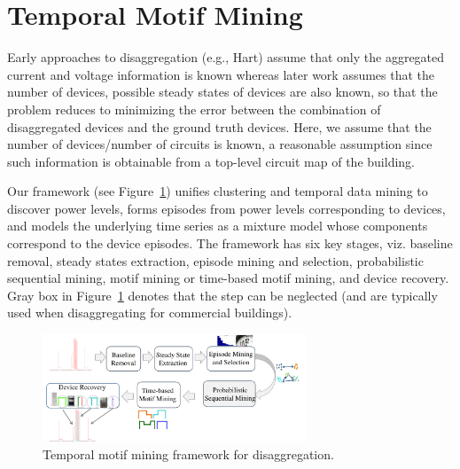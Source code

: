 %

\section{Temporal Motif Mining}
Early approaches to disaggregation (e.g., Hart\cite{hart1992})
assume that only the
aggregated current and voltage information is known whereas
later work assumes that the number of devices, possible steady states
of devices are also known,
so that the problem reduces to minimizing the error between
the combination of disaggregated devices and the ground truth devices.
Here, we assume that the number of devices/number of circuits is known,
a reasonable assumption since such information is obtainable from a top-level
circuit map of the building.

%
Our framework (see Figure~\ref{fig_fw})
unifies clustering and temporal data mining
to discover power levels,
forms episodes from power levels corresponding to devices,
and models the underlying time series as a mixture model whose components
correspond to the device episodes.
The framework has six key stages, viz.
baseline removal,
steady states extraction,
episode mining and selection,
probabilistic sequential mining,
motif mining or time-based motif mining, and
device recovery.
Gray box in Figure~\ref{fig_fw} denotes that the step can be neglected
(and are typically used when disaggregating for commercial buildings).

\begin{figure}[!hbtp]
\centering
\includegraphics[width=0.7\textwidth]{disaggfigs/arch.pdf}
\caption {Temporal motif mining framework for disaggregation.}
\label{fig_fw}
\end{figure}

